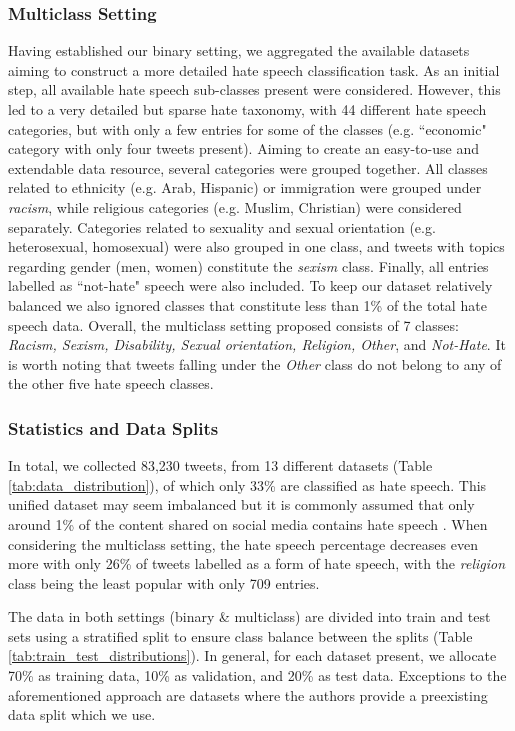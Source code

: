 \subsubsection{Multiclass Setting}
Having established our binary setting, we aggregated the available datasets aiming to construct a more detailed hate speech classification task. As an initial step, all available hate speech sub-classes present were considered.  However, this led to a very detailed but sparse hate taxonomy, with 44 different hate speech categories, but with only a few entries for some of the classes (e.g. ``economic" category with only four tweets present). Aiming to create an easy-to-use and extendable data resource, several categories were grouped together. All classes related to ethnicity (e.g. Arab, Hispanic) or immigration were grouped under \textit{racism}, while religious categories (e.g. Muslim, Christian) were considered separately. Categories related to sexuality and sexual orientation (e.g. heterosexual, homosexual) were also grouped in one class, and tweets with topics regarding gender (men, women) constitute the \textit{sexism} class. Finally, all entries labelled as ``not-hate" speech were also included. To keep our dataset relatively balanced we also ignored classes that constitute less than 1\% of the total hate speech data. Overall, the multiclass setting proposed consists of 7 classes: \textit{Racism, Sexism, Disability, Sexual orientation, Religion, Other}, and \textit{Not-Hate}. It is worth noting that tweets falling under the \textit{Other} class do not belong to any of the other five hate speech classes.



\subsubsection{Statistics and Data Splits}
\label{summarydata}
In total, we collected 83,230 tweets, from 13 different datasets (Table \ref{tab:data_distribution}), of which only 33\% are classified as hate speech. This unified dataset may seem imbalanced but it is commonly assumed that only around 1\% of the content shared on social media contains hate speech \cite{pereira2019detecting}. When considering the multiclass setting, the hate speech percentage decreases even more with only 26\% of tweets labelled as a form of hate speech, with the \textit{religion} class being the least popular with only 709 entries.

The data in both settings (binary \& multiclass) are divided into train and test sets using a stratified split to ensure class balance between the splits (Table \ref{tab:train_test_distributions}). In general, for each dataset present, we allocate 70\% as training data, 10\% as validation, and 20\% as test data. Exceptions to the aforementioned approach are datasets where the authors provide a preexisting data split which we use.

